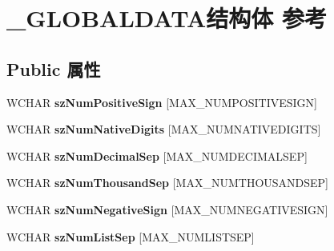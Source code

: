 \hypertarget{struct___g_l_o_b_a_l_d_a_t_a}{}\section{\+\_\+\+G\+L\+O\+B\+A\+L\+D\+A\+T\+A结构体 参考}
\label{struct___g_l_o_b_a_l_d_a_t_a}
\subsection*{Public 属性}
\begin{DoxyCompactItemize}
\item 
\mbox{\label{struct___g_l_o_b_a_l_d_a_t_a_a894f5d36990c77f22fbd22f2a0c4c241}} 
W\+C\+H\+AR {\bfseries sz\+Num\+Positive\+Sign} \mbox{[}M\+A\+X\+\_\+\+N\+U\+M\+P\+O\+S\+I\+T\+I\+V\+E\+S\+I\+GN\mbox{]}
\item 
\mbox{\label{struct___g_l_o_b_a_l_d_a_t_a_a7814aeab53db45e15a24102ed2669bd8}} 
W\+C\+H\+AR {\bfseries sz\+Num\+Native\+Digits} \mbox{[}M\+A\+X\+\_\+\+N\+U\+M\+N\+A\+T\+I\+V\+E\+D\+I\+G\+I\+TS\mbox{]}
\item 
\mbox{\label{struct___g_l_o_b_a_l_d_a_t_a_aaae70254f1a8e1a69b23408b1fef5153}} 
W\+C\+H\+AR {\bfseries sz\+Num\+Decimal\+Sep} \mbox{[}M\+A\+X\+\_\+\+N\+U\+M\+D\+E\+C\+I\+M\+A\+L\+S\+EP\mbox{]}
\item 
\mbox{\label{struct___g_l_o_b_a_l_d_a_t_a_af50ef282dbb65ca721d546f11916630f}} 
W\+C\+H\+AR {\bfseries sz\+Num\+Thousand\+Sep} \mbox{[}M\+A\+X\+\_\+\+N\+U\+M\+T\+H\+O\+U\+S\+A\+N\+D\+S\+EP\mbox{]}
\item 
\mbox{\label{struct___g_l_o_b_a_l_d_a_t_a_ac5426169e0efde73fbf63bcdcd4099f4}} 
W\+C\+H\+AR {\bfseries sz\+Num\+Negative\+Sign} \mbox{[}M\+A\+X\+\_\+\+N\+U\+M\+N\+E\+G\+A\+T\+I\+V\+E\+S\+I\+GN\mbox{]}
\item 
\mbox{\label{struct___g_l_o_b_a_l_d_a_t_a_a4b94f20bfa4be09dd69d5de0f4240db7}} 
W\+C\+H\+AR {\bfseries sz\+Num\+List\+Sep} \mbox{[}M\+A\+X\+\_\+\+N\+U\+M\+L\+I\+S\+T\+S\+EP\mbox{]}
\item 
\mbox{\label{struct___g_l_o_b_a_l_d_a_t_a_a4d7187092e868d2a7da315bc0404b676}} 

\end{DoxyCompactItemize}
